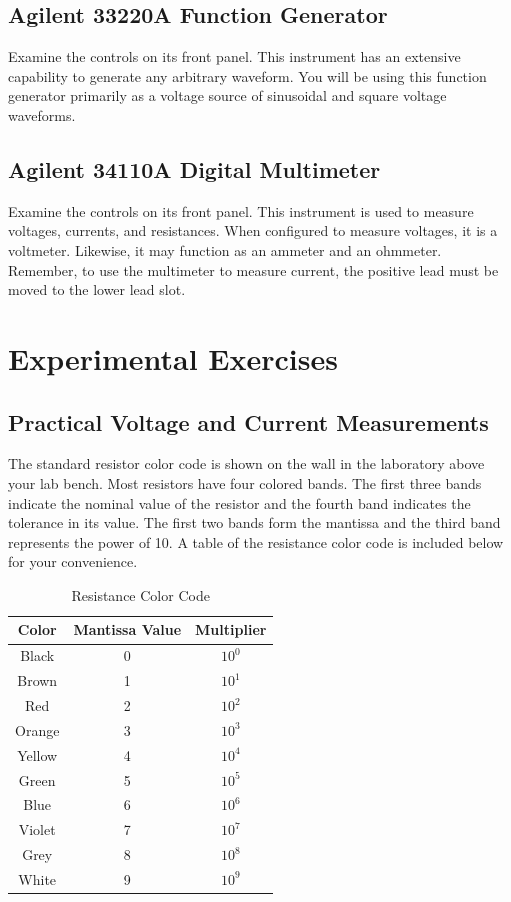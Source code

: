 \documentclass[12pt]{../manual}
\begin{document}
\subsection{Agilent 33220A Function Generator}
Examine the controls on its front panel. This instrument has an extensive capability to generate any arbitrary waveform. You will be using this function generator primarily as a voltage source of sinusoidal and square voltage waveforms. 

\subsection{Agilent 34110A Digital Multimeter}
Examine the controls on its front panel. This instrument is used to measure voltages, currents, and resistances. When configured to measure voltages, it is a voltmeter. Likewise, it may function as an ammeter and an ohmmeter. Remember, to use the multimeter to measure current, the positive lead must be moved to the lower lead slot. 

\section{Experimental Exercises}
\subsection{Practical Voltage and Current Measurements}
The standard resistor color code is shown on the wall in the laboratory above your lab bench. Most resistors have four colored bands. The first three bands indicate the nominal value of the resistor and the fourth band indicates the tolerance in its value. The first two bands form the mantissa and the third band represents the power of 10. A table of the resistance color code is included below for your convenience.

\def\arraystretch{1.4}
\begin{table}[ht!]
\caption{Resistance Color Code}
\centering
\begin{tabular}{|c|c|c|} \hline
Color 	& Mantissa Value & Multiplier \\ \hline \hline
Black 	& 0 & $10^0$ \\ \hline
Brown 	& 1 & $10^1$ \\ \hline
Red 	& 2 & $10^2$ \\ \hline
Orange 	& 3 & $10^3$ \\ \hline
Yellow	& 4 & $10^4$ \\ \hline
Green	& 5 & $10^5$ \\ \hline
Blue	& 6 & $10^6$ \\ \hline
Violet	& 7 & $10^7$ \\ \hline
Grey	& 8 & $10^8$ \\ \hline
White	& 9 & $10^9$ \\ \hline
\end{tabular}
\end{table}
\end{document}
